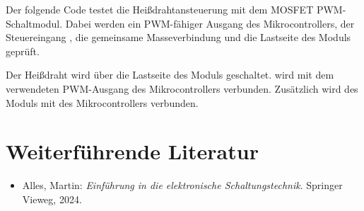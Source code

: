Der folgende Code testet die Heißdrahtansteuerung mit dem MOSFET PWM-Schaltmodul. 
Dabei werden ein PWM-fähiger Ausgang des Mikrocontrollers, der Steuereingang , die gemeinsame Masseverbindung und die Lastseite des Moduls geprüft.

Der Heißdraht wird über die Lastseite des Moduls geschaltet. 
 wird mit dem verwendeten PWM-Ausgang des Mikrocontrollers verbunden. 
Zusätzlich wird  des Moduls mit  des Mikrocontrollers verbunden.

\begin{code}[H]
	\label{Code:MosfetHotwireTest}
\end{code}

\section{Weiterführende Literatur}

\begin{itemize}
	\item Alles, Martin: \textit{Einführung in die elektronische Schaltungstechnik}. Springer Vieweg, 2024.

\end{itemize}